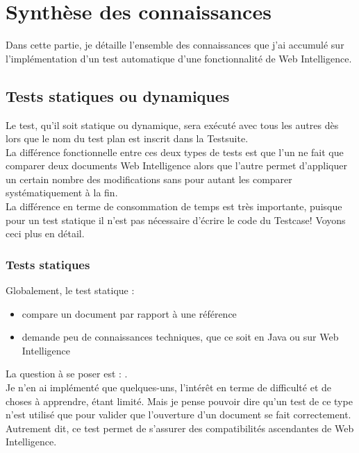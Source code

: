 

\section{Synth\`{e}se des connaissances}
Dans cette partie, je d\'{e}taille l'ensemble des connaissances que j'ai accumul\'{e} sur l'impl\'{e}mentation d'un test automatique d'une fonctionnalit\'{e} de Web Intelligence.\\

\subsection{Tests statiques ou dynamiques}

Le test, qu'il soit statique ou dynamique, sera ex\'{e}cut\'{e} avec tous les autres d\`{e}s lors que le nom du test plan est inscrit dans la \gls{Testsuite}.\\
La diff\'{e}rence fonctionnelle entre ces deux types de tests est que l'un ne fait que comparer deux documents Web Intelligence alors que l'autre permet d'appliquer un certain nombre des modifications sans pour autant les comparer syst\'{e}matiquement \`{a} la fin.\\
La diff\'{e}rence en terme de consommation de temps est tr\`{e}s importante, puisque pour un test statique il n'est pas n\'{e}cessaire d'\'{e}crire le code du \gls{Testcase}! Voyons ceci plus en d\'{e}tail.

\subsubsection{Tests statiques}
Globalement, le test statique :

\begin{itemize}
	\item compare un document par rapport \`{a} une r\'{e}f\'{e}rence
	\item demande peu de connaissances techniques, que ce soit en \gls{Java} ou sur Web Intelligence
\end{itemize}

La question \`{a} se poser est : .\\
Je n'en ai impl\'{e}menté que quelques-uns, l'int\'{e}r\^{e}t en terme de difficult\'{e} et de choses \`{a} apprendre, \'{e}tant limit\'{e}. Mais je pense pouvoir dire qu'un test de ce type n'est utilis\'{e} que pour valider que l'ouverture d'un document se fait correctement. Autrement dit, ce test permet de s'assurer des compatibilit\'{e}s ascendantes de Web Intelligence.\\

